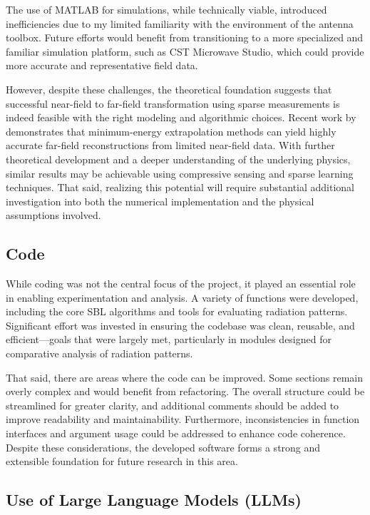 \documentclass{article}
\begin{document}
The use of MATLAB for simulations, while technically viable, introduced inefficiencies due to my limited familiarity with the environment of the antenna toolbox. Future efforts would benefit from transitioning to a more specialized and familiar simulation platform, such as CST Microwave Studio, which could provide more accurate and representative field data.

However, despite these challenges, the theoretical foundation suggests that successful near-field to far-field transformation using sparse measurements is indeed feasible with the right modeling and algorithmic choices. Recent work by \citet{Hofmann2019minimum} demonstrates that minimum-energy extrapolation methods can yield highly accurate far-field reconstructions from limited near-field data. With further theoretical development and a deeper understanding of the underlying physics, similar results may be achievable using compressive sensing and sparse learning techniques. That said, realizing this potential will require substantial additional investigation into both the numerical implementation and the physical assumptions involved.
\subsection{Code}

While coding was not the central focus of the project, it played an essential role in enabling experimentation and analysis. A variety of functions were developed, including the core SBL algorithms and tools for evaluating radiation patterns. Significant effort was invested in ensuring the codebase was clean, reusable, and efficient—goals that were largely met, particularly in modules designed for comparative analysis of radiation patterns.

That said, there are areas where the code can be improved. Some sections remain overly complex and would benefit from refactoring. The overall structure could be streamlined for greater clarity, and additional comments should be added to improve readability and maintainability. Furthermore, inconsistencies in function interfaces and argument usage could be addressed to enhance code coherence. Despite these considerations, the developed software forms a strong and extensible foundation for future research in this area.

\subsection{Use of Large Language Models (LLMs)} 
\end{document}
